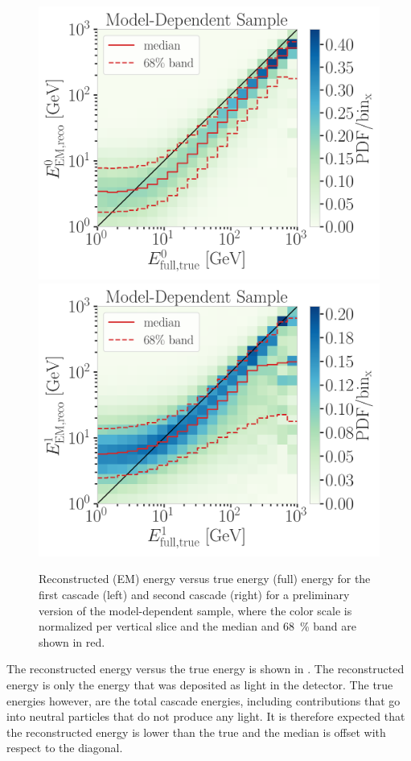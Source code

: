 \begin{figure}[h!]
	\centering
    \includegraphics[width=0.49\linewidth]{figures/results/190607/resolutions/casc0_reco_energy_vs_casc0_true_energy_final_level_good_step_contours.png}
    \includegraphics[width=0.49\linewidth]{figures/results/190607/resolutions/casc1_reco_energy_vs_casc1_true_energy_final_level_good_step_contours.png}
    \caption[Reconstructed cascade energies versus true energies - preliminary model-dependent sample]{Reconstructed (EM) energy versus true energy (full) energy for the first cascade (left) and second cascade (right) for a preliminary version of the model-dependent sample, where the color scale is normalized per vertical slice and the median and \SI{68}{\percent} band are shown in red.}
\end{figure}

The reconstructed energy versus the true energy is shown in . The reconstructed energy is only the energy that was deposited as light in the detector. The true energies however, are the total cascade energies, including contributions that go into neutral particles that do not produce any light. It is therefore expected that the reconstructed energy is lower than the true and the median is offset with respect to the diagonal.

